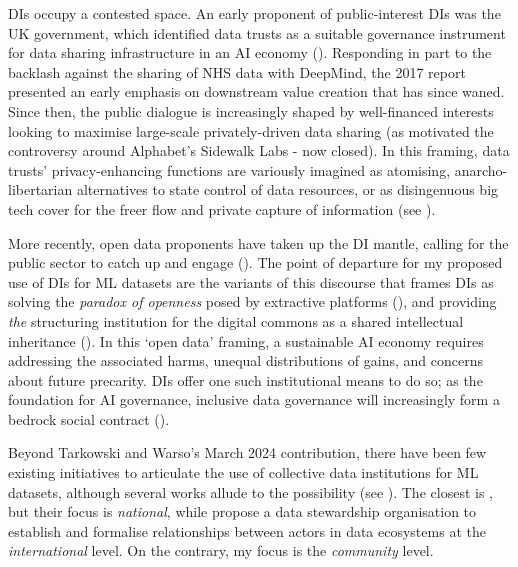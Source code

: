 DIs occupy a contested space. An early proponent of public-interest DIs was the UK government, which identified data trusts as a suitable governance instrument for data sharing infrastructure in an AI economy (\cite{hall2017GrowingArtificialIntelligence}). Responding in part to the backlash against the sharing of NHS data with DeepMind, the 2017 report presented an early emphasis on downstream value creation that has since waned. Since then, the public dialogue is increasingly shaped by well-financed interests looking to maximise large-scale privately-driven data sharing (as motivated the controversy around Alphabet's Sidewalk Labs - now closed). In this framing, data trusts’ privacy-enhancing functions are variously imagined as atomising, anarcho-libertarian alternatives to state control of data resources, or as disingenuous big tech cover for the freer flow and private capture of information (see \textcite{bietti2021GenealogyDigitalPlatform}). 

More recently, open data proponents have taken up the DI mantle, calling for the public sector to catch up and engage (\cite{RoleGovernmentProvider, 2022HowCanUK}). The point of departure for my proposed use of DIs for ML datasets are the variants of this discourse that frames DIs as solving the \textit{paradox of openness} posed by extractive platforms (\cite{jameson2019ExtractiveLogicsSystemic, verdegem2022DismantlingAICapitalism}), and providing \textit{the} structuring institution for the digital commons as a shared intellectual inheritance (\cite{khong2023ARTIFICIALINTELLIGENCECOMMON}). In this `open data' framing, a sustainable AI economy requires addressing the associated harms, unequal distributions of gains, and concerns about future precarity. DIs offer one such institutional means to do so; as the foundation for AI governance, inclusive data governance will increasingly form a bedrock social contract (\cite{InterwovenRealmsData}). 

Beyond Tarkowski and Warso's March 2024 contribution, there have been few existing initiatives to articulate the use of collective data institutions for ML datasets, although several works allude to the possibility (see \textcite{delacroix2020DemocratisingDigitalRevolution, huang2023GenerativeAIDigital, zygmuntowski2021EmbeddingEuropeanValues}). The closest is \textcite{chan2023ReclaimingDigitalCommons}, but their focus is \textit{national}, while \cite{jernite2022DataGovernanceAge} propose a data stewardship organisation to establish and formalise relationships between actors in data ecosystems at the \textit{international} level. On the contrary, my focus is the \textit{community} level.


